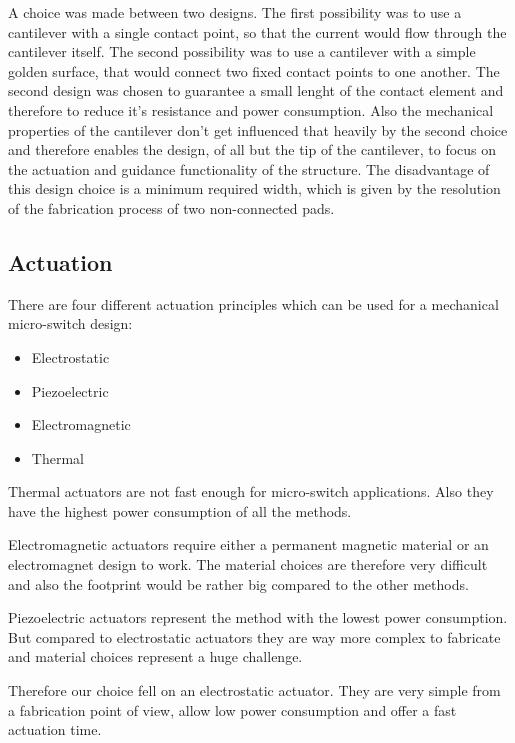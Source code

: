 A choice was made between two designs.
The first possibility was to use a cantilever with a single contact point, so that the current would flow through the cantilever itself. %
The second possibility was to use a cantilever with a simple golden surface, that would connect two fixed contact points to one another. %
The second design was chosen to guarantee a small lenght of the contact element and therefore to reduce it's resistance and power consumption.
Also the mechanical properties of the cantilever don't get influenced that heavily by the second choice and therefore enables the design, of all but the tip of the cantilever, to focus on the actuation and guidance functionality of the structure.
The disadvantage of this design choice is a minimum required width, which is given by the resolution of the fabrication process of two non-connected pads.

\subsection{Actuation}
\label{sec:actuation}
There are four different actuation principles which can be used for a mechanical micro-switch design:
\begin{itemize}
  \item Electrostatic
  \item Piezoelectric
  \item Electromagnetic
  \item Thermal
\end{itemize}

Thermal actuators are not fast enough for micro-switch applications. 
Also they have the highest power consumption of all the methods.

Electromagnetic actuators require either a permanent magnetic material or an electromagnet design to work.
The material choices are therefore very difficult and also the footprint would be rather big compared to the other methods.

Piezoelectric actuators represent the method with the lowest power consumption.
But compared to electrostatic actuators they are way more complex to fabricate and material choices represent a huge challenge.\cite{klaasse2002piezoelectric}

Therefore our choice fell on an electrostatic actuator.
They are very simple from a fabrication point of view, allow low power consumption and offer a fast actuation time.
